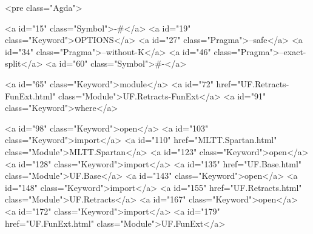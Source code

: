 <pre class="Agda">

<a id="15" class="Symbol">{-#</a> <a id="19" class="Keyword">OPTIONS</a> <a id="27" class="Pragma">--safe</a> <a id="34" class="Pragma">--without-K</a> <a id="46" class="Pragma">--exact-split</a> <a id="60" class="Symbol">#-}</a>

<a id="65" class="Keyword">module</a> <a id="72" href="UF.Retracts-FunExt.html" class="Module">UF.Retracts-FunExt</a> <a id="91" class="Keyword">where</a>

<a id="98" class="Keyword">open</a> <a id="103" class="Keyword">import</a> <a id="110" href="MLTT.Spartan.html" class="Module">MLTT.Spartan</a>
<a id="123" class="Keyword">open</a> <a id="128" class="Keyword">import</a> <a id="135" href="UF.Base.html" class="Module">UF.Base</a>
<a id="143" class="Keyword">open</a> <a id="148" class="Keyword">import</a> <a id="155" href="UF.Retracts.html" class="Module">UF.Retracts</a>
<a id="167" class="Keyword">open</a> <a id="172" class="Keyword">import</a> <a id="179" href="UF.FunExt.html" class="Module">UF.FunExt</a>

